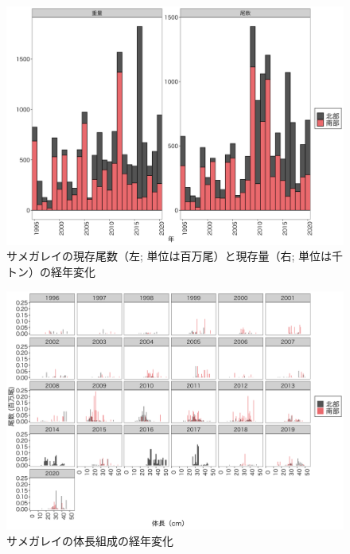 \documentclass[11pt]{article} %
\begin{document}
\begin{linenumbers}
\begin{figure}[h]
  \centering
  \includegraphics[width = 14cm]{サメガレイtrend.png}
  \caption{サメガレイの現存尾数（左; 単位は百万尾）と現存量（右; 単位は千トン）の経年変化}
\end{figure}

\begin{figure}[h]
  \centering
  \includegraphics[width = 14cm]{サメガレイlength.png}
  \caption{サメガレイの体長組成の経年変化}
\end{figure}


\end{linenumbers}
\end{document}

